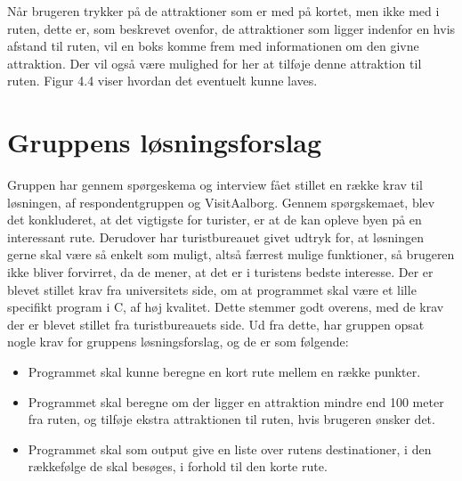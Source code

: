Når brugeren trykker på de attraktioner som er med på kortet, men ikke med i ruten, dette er, som beskrevet ovenfor, de attraktioner som ligger indenfor en hvis afstand til ruten, vil en boks komme frem med informationen om den givne attraktion. Der vil også være mulighed for her at tilføje denne attraktion til ruten. Figur 4.4 viser hvordan det eventuelt kunne laves. \newline
\newline
\newline
\newline
\newline
\newline
\newline
\newline
\newline
\newline
\newline


\section{Gruppens løsningsforslag}
Gruppen har gennem spørgeskema og interview fået stillet en række krav til løsningen, af respondentgruppen og VisitAalborg. 
Gennem spørgskemaet, blev det konkluderet, at det vigtigste for turister, er at de kan opleve byen på en interessant rute. 
Derudover har turistbureauet givet udtryk for, at løsningen gerne skal være så enkelt som muligt, altså færrest mulige funktioner, så brugeren ikke bliver forvirret, da de mener, at det er i turistens bedste interesse. \newline
Der er blevet stillet krav fra universitets side, om at programmet skal være et lille specifikt program i C, af høj kvalitet. Dette stemmer godt overens, med de krav der er blevet stillet fra turistbureauets side.   \newline
Ud fra dette, har gruppen opsat nogle krav for gruppens løsningsforslag, og de er som følgende:
\begin{itemize}
	\item Programmet skal kunne beregne en kort rute mellem en række punkter.
	\item Programmet skal beregne om der ligger en attraktion mindre end 100 meter fra ruten, og tilføje ekstra attraktionen til ruten, hvis brugeren ønsker det.
	\item Programmet skal som output give en liste over rutens destinationer, i den rækkefølge de skal besøges, i forhold til den korte rute.
\end{itemize}


